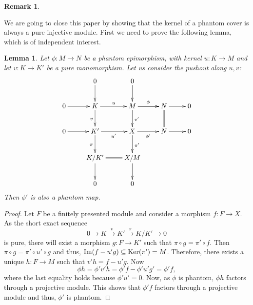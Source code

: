 \documentclass[11pt]{amsart}
\newtheorem{lema}[teor]{Lemma}
\newtheorem{rem}[teor]{Remark}
\begin{document}
{\begin{rem}
\end{rem}

We are going to close this paper by showing that the kernel of a phantom cover is always a pure injective module. First we need to prove the following lemma, which is of independent interest.

\begin{lema}\label{indep}
Let $\phi:M\to N$ be a phantom epimorphism, with kernel $u:K\to M$ and let $v:K\to K'$ be a pure monomorphism. Let us consider the pushout along $u,v$:
 $$\xymatrix{ & 0\ar[d] & 0\ar[d] &  &\\
0\ar[r] & K\ar[d]_v\ar[r]^{u} & M \ar[r]^{\phi} \ar[d]^{v'}\ar[r] &N\ar@{=}[d]\ar[r] &0\\
0\ar[r] & K'\ar[d]_{\pi}\ar[r]_{u'} & X\ar[d]^{\pi'} \ar[r]_{\phi'} &N\ar[r] &0 \\ & K/K'\ar@{=}[r]\ar[d] & X/M\ar[d] &  &\\& 0 & 0 &  & }$$
Then $\phi'$ is also a phantom map.
\end{lema}
\begin{proof}
Let $F$ be a finitely presented module and consider a morphism $f:F\to X$. As the short exact sequence 
$$0\to K\stackrel{v}{\longrightarrow}K'\stackrel{\pi}{\longrightarrow}K/K'\to 0$$ 
is pure, there will exist a morphism $g:F\to K'$ such that $\pi\circ g=\pi'\circ f$. Then $\pi\circ g=\pi'\circ u'\circ g$ and thus, ${\mathop{\rm Im}\nolimits}(f-u'g)\subseteq {\mathop{\rm Ker}\nolimits}(\pi')=M$. Therefore, there exists a unique $h:F\to M$ such that $v'h=f-u'g$.
Now $$ \phi h=\phi'v'h=\phi'f-\phi'u'g'=\phi'f,$$ where the last equality holds because $\phi'u'=0$. Now, as $\phi$ is phantom, $\phi h$ factors through a projective module. This shows that $\phi' f$ factors through a projective module and thus, $\phi'$ is phantom.

\end{proof}

}
\end{document}

